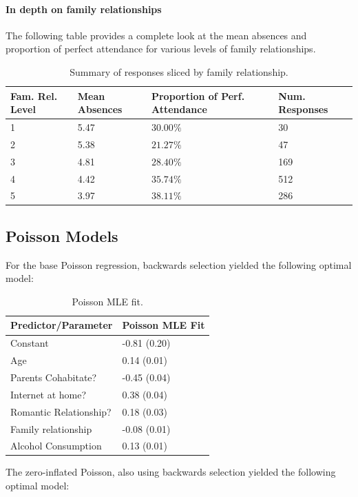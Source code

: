 \documentclass[12pt, titlepage]{article}
\begin{document}
	\paragraph{In depth on family relationships} The following table provides a complete look at the mean absences and proportion of perfect attendance for various levels of family relationships.
	
	\begin{table}[h!]
		\begin{tabular}{|l|l|l|l|}
			\hline
			Fam. Rel. Level & Mean Absences & Proportion of Perf. Attendance & Num. Responses \\
			\hline
			1 & 5.47 & $30.00\%$ & 30 \\
			2 & 5.38 & $21.27\%$ & 47 \\
			3 & 4.81 & $28.40\%$ & 169 \\
			4 & 4.42 & $35.74\%$ & 512 \\
			5 & 3.97 & $38.11\%$ & 286 \\
			\hline
		\end{tabular}
	\caption{Summary of responses sliced by family relationship.}
	\end{table}

	\subsection*{Poisson Models}
	For the base Poisson regression, backwards selection yielded the following optimal model:
	\begin{table}[h!]
		\centering
		\begin{tabular}{|l|l|}
			\hline
			Predictor/Parameter & Poisson MLE Fit  \\
			\hline 
			Constant & -0.81 (0.20) \\
			Age & 0.14 (0.01)  \\
			Parents Cohabitate? & -0.45 (0.04) \\
			Internet at home?& 0.38 (0.04)  \\
			Romantic Relationship?& 0.18 (0.03)  \\
			Family relationship & -0.08 (0.01) \\ 
			Alcohol Consumption & 0.13 (0.01) \\
			\hline
		\end{tabular}
		\caption{Poisson MLE fit.}
	\end{table}

	The zero-inflated Poisson, also using backwards selection yielded the following optimal model:
	
\end{document}
